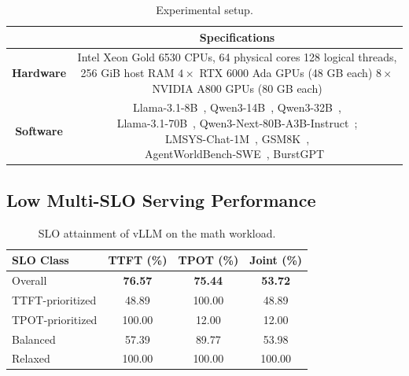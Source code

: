\begin{table}[t]
  \footnotesize
  \renewcommand{\arraystretch}{1.05}
  \setlength{\tabcolsep}{3pt}
  \caption{Experimental setup.}
  \label{tab:motivation-setup}
  \centering
    \begin{tabular}{c|c}
      \hline
      & \textbf{Specifications} \\
      \hline
      \textbf{Hardware} & \makecell[c]{Intel Xeon Gold 6530 CPUs, 64 physical cores \\
        128 logical threads, 256 GiB host RAM \\
        $4\times$ RTX 6000 Ada GPUs (48 GB each) \\
        $8\times$ NVIDIA A800 GPUs (80 GB each)} \\
      \hline
      \textbf{Software} & \makecell[c]{Llama-3.1-8B~\cite{grattafiori2024llama3}, Qwen3-14B~\cite{yang2025qwen3}, Qwen3-32B~\cite{yang2025qwen3},\\
        Llama-3.1-70B~\cite{grattafiori2024llama3}, Qwen3-Next-80B-A3B-Instruct~\cite{qwen2025next};\\
        LMSYS-Chat-1M~\cite{zheng2024lmsyschat}, GSM8K~\cite{cobbe2021gsm8k},\\
        AgentWorldBench-SWE~\cite{zuo2026agentworld}, BurstGPT~\cite{wang2025burstgpt}} \\
      \hline
    \end{tabular}%
  \vspace{-3mm}
\end{table}

\subsection{Low Multi-SLO Serving Performance}
\label{subsec:low-multi-slo-performance}

\begin{table}[t]
  \centering
  \caption{SLO attainment of vLLM on the math workload.}
  \label{tab:fcfs-multi-slo-attainment}
  \footnotesize
  \setlength{\tabcolsep}{3pt}
  \renewcommand{\arraystretch}{1.10}
  \begin{tabular}{lccc}
    \hline
    \textbf{SLO Class} &
    \textbf{TTFT (\%)} &
    \textbf{TPOT (\%)} &
    \textbf{Joint (\%)} \\
    \hline
    Overall          & \textbf{76.57} & \textbf{75.44} & \textbf{53.72} \\
    TTFT-prioritized & 48.89 & 100.00 & 48.89 \\
    TPOT-prioritized & 100.00 & 12.00 & 12.00 \\
    Balanced         & 57.39 & 89.77 & 53.98 \\
    Relaxed          & 100.00 & 100.00 & 100.00 \\
    \hline
  \end{tabular}
  \vspace{-3mm}
\end{table}


